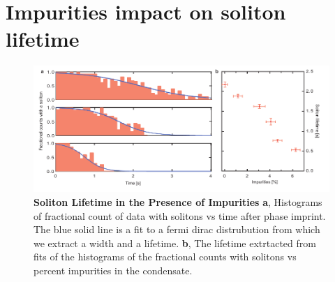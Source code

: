 \documentclass{nature}
\begin{document}
\section{Impurities impact on soliton lifetime}
\begin{figure}[h!]
   \includegraphics[width=136mm]{Figures/Fig3_Life.pdf}
   \caption{\textbf{Soliton Lifetime in the Presence of Impurities} \textbf{a}, Histograms of fractional count of data with solitons vs time after phase imprint. The blue solid line is a fit to a fermi dirac distrubution from which we extract a width and a lifetime. \textbf{b}, The lifetime extrtacted from fits of the histograms of the fractional counts with solitons vs percent impurities in the condensate.}
   \label{solLife}
\end{figure}
\end{document}
